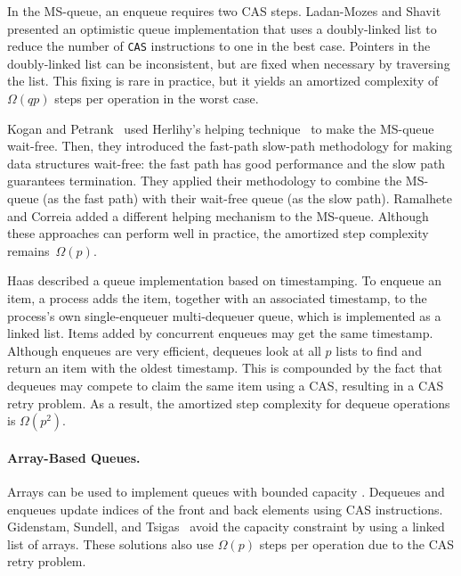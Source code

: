 In the MS-queue, an enqueue requires two CAS steps.
Ladan-Mozes and Shavit~\cite{DBLP:journals/dc/Ladan-MozesS08}
presented an optimistic  queue implementation
that uses a doubly-linked list to reduce the number of
\texttt{CAS} instructions to one in the best case. 
Pointers in the doubly-linked list can be inconsistent, but are fixed when necessary by traversing the list.
This fixing is rare in practice, but it yields an amortized complexity of $\Omega(qp)$ 
steps per operation in the worst case.

Kogan and Petrank~\cite{DBLP:conf/ppopp/KoganP11} 
used Herlihy's helping
technique~\cite{10.1145/114005.102808} to make the MS-queue
wait-free.
Then, they introduced the 
fast-path slow-path methodology \cite{10.1145/2370036.2145835} for making data structures wait-free:
the fast path has good performance and the slow path guarantees termination.
They applied their methodology to combine the MS-queue (as the fast path)
with their wait-free queue (as the slow path).
Ramalhete and Correia \cite{RC17} added a different helping mechanism to the MS-queue.
Although these approaches can perform well in practice,
the amortized step complexity remains~$\Omega(p)$. 

Haas \cite{Haa15} described a queue implementation based on timestamping.
To enqueue an item, a process adds the item, together with an associated timestamp,
to the process's own single-enqueuer multi-dequeuer queue, which is implemented as a linked list.  
Items added by concurrent enqueues may get the same timestamp.
Although enqueues are very efficient, dequeues look at all $p$ lists
to find and return an item with the oldest timestamp.
This is compounded by the fact that dequeues may compete to claim the same item using a CAS, resulting
in a CAS retry problem.  As a result, the amortized step complexity for dequeue operations
is $\Omega(p^2)$.

\paragraph{Array-Based Queues.}
Arrays can be used to implement queues with bounded capacity \cite{DBLP:conf/iceccs/ColvinG05,PMG16,DBLP:conf/icdcn/Shafiei09,DBLP:conf/spaa/TsigasZ01}.  
Dequeues and enqueues update
indices of the front and back elements using CAS instructions.
Gidenstam, Sundell, and Tsigas~\cite{DBLP:conf/opodis/GidenstamST10} avoid
the capacity constraint by using a linked list of arrays.
These solutions also use $\Omega(p)$ steps per operation due to the CAS retry problem.

